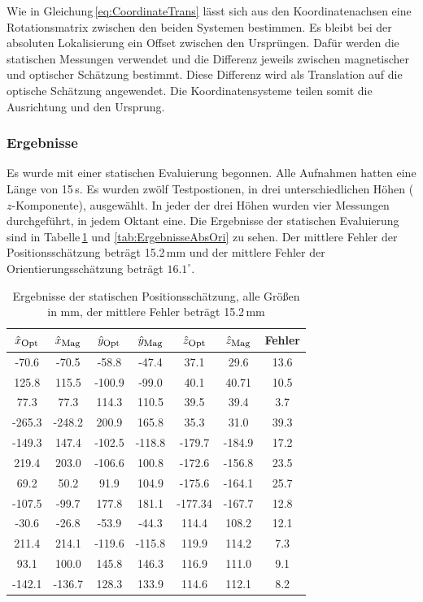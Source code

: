 Wie in Gleichung\,\ref{eq:CoordinateTrans} lässt sich aus den Koordinatenachsen eine Rotationsmatrix zwischen den beiden Systemen bestimmen. Es bleibt bei der absoluten Lokalisierung ein Offset zwischen den Ursprüngen. Dafür werden die statischen Messungen verwendet und die Differenz jeweils zwischen magnetischer und optischer Schätzung bestimmt. Diese Differenz wird als Translation auf die optische Schätzung angewendet. Die Koordinatensysteme teilen somit die Ausrichtung und den Ursprung.

\subsubsection{Ergebnisse}
Es wurde mit einer statischen Evaluierung begonnen. Alle Aufnahmen hatten eine Länge von 15\,s. Es wurden zwölf Testpostionen, in drei unterschiedlichen Höhen ($z$-Komponente), ausgewählt. In jeder der drei Höhen wurden vier Messungen durchgeführt, in jedem Oktant eine. Die Ergebnisse der statischen Evaluierung sind in Tabelle\,\ref{tab:ErgebnisseAbsPos} und \ref{tab:ErgebnisseAbsOri} zu sehen. Der mittlere Fehler der Positionsschätzung beträgt 15.2\,mm und der mittlere Fehler der Orientierungsschätzung beträgt $16.1^\circ$.
\begin{table}[h]
  \centering
  \begin{tabular}{|c| c| c| c| c| c| c|}
  \hline 
   \rowcolor{gray}$\hat{x}_{\textrm{\footnotesize{Opt}}}$ & $\hat{x}_{\textrm{\footnotesize{Mag}}}$ & $\hat{y}_{\textrm{\footnotesize{Opt}}}$ & $\hat{y}_{\textrm{\footnotesize{Mag}}}$ & $\hat{z}_{\textrm{\footnotesize{Opt}}}$ & $\hat{z}_{\textrm{\footnotesize{Mag}}}$ & Fehler \\ 
   \hline
   -70.6 & -70.5 & -58.8  & -47.4 & 37.1& 29.6  & 13.6 \\ 
   \hline
   \rowcolor{lightgray}125.8 & 115.5 & -100.9  & -99.0 & 40.1 & 40.71  & 10.5 \\ 
   \hline
   77.3 & 77.3 & 114.3  & 110.5 & 39.5 & 39.4  & 3.7 \\ 
   \hline
   \rowcolor{lightgray}-265.3 & -248.2 & 200.9  & 165.8 & 35.3 & 31.0  & 39.3 \\ 
   \hline
   -149.3 & 147.4 & -102.5  & -118.8 & -179.7 & -184.9  & 17.2 \\ 
   \hline
   \rowcolor{lightgray}219.4 & 203.0 & -106.6  & 100.8 & -172.6 & -156.8  & 23.5 \\ 
   \hline
   69.2 & 50.2 & 91.9  & 104.9 & -175.6 & -164.1  & 25.7 \\ 
   \hline
   \rowcolor{lightgray}-107.5 & -99.7 & 177.8  & 181.1 & -177.34 & -167.7  & 12.8 \\ 
   \hline
   -30.6 & -26.8 & -53.9  & -44.3 & 114.4 & 108.2  & 12.1 \\ 
   \hline
   \rowcolor{lightgray}211.4 & 214.1 & -119.6  & -115.8 & 119.9 & 114.2  & 7.3 \\ 
   \hline
   93.1 & 100.0 & 145.8  & 146.3 & 116.9 & 111.0  & 9.1 \\ 
   \hline
   \rowcolor{lightgray}-142.1 & -136.7 & 128.3  & 133.9 & 114.6 & 112.1  & 8.2 \\ 
   \hline
  \end{tabular}
  \caption{Ergebnisse der statischen Positionsschätzung, alle Größen in mm, der mittlere Fehler beträgt 15.2\,mm}
  \label{tab:ErgebnisseAbsPos}
\end{table}

